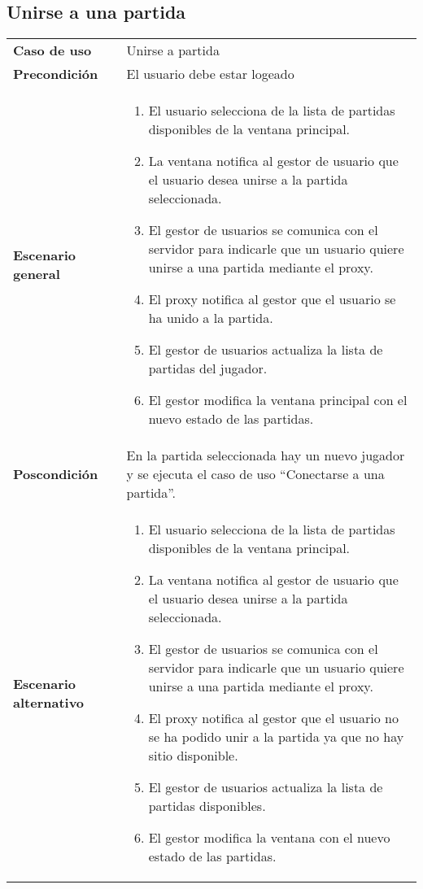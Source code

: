 \subsection{Unirse a una partida}
{\footnotesize
\begin{tabularx}{0.95\textwidth}{p{}|X}

\textbf{Caso de uso} & Unirse a partida \\

\textbf{Precondición} & El usuario debe estar logeado \\

\textbf{Escenario general} & \begin{enumerate}
\item El usuario selecciona de la lista de partidas disponibles de la ventana
principal.
\item La ventana notifica al gestor de usuario que el usuario desea unirse a la
partida seleccionada.
\item El gestor de usuarios se comunica con el servidor para indicarle que un
usuario quiere unirse a una partida mediante el proxy.
\item El proxy notifica al gestor que el usuario se ha unido a la partida.
\item El gestor de usuarios actualiza la lista de partidas del jugador.
\item El gestor modifica la ventana principal con el nuevo estado de las
partidas.
\end{enumerate} \\

\textbf{Poscondición} & En la partida seleccionada hay un nuevo jugador y se
ejecuta el caso de uso ``Conectarse a una partida''.\\

\textbf{Escenario alternativo} & \begin{enumerate}
\item El usuario selecciona de la lista de partidas disponibles de la ventana
principal.
\item La ventana notifica al gestor de usuario que el usuario desea unirse a la
partida seleccionada.
\item El gestor de usuarios se comunica con el servidor para indicarle que un
usuario quiere unirse a una partida mediante el proxy.
\item El proxy notifica al gestor que el usuario no se ha podido unir a la
partida ya que no hay sitio disponible.
\item El gestor de usuarios actualiza la lista de partidas disponibles.
\item El gestor modifica la ventana con el nuevo estado de las partidas.
\end{enumerate}

\end{tabularx}
}

